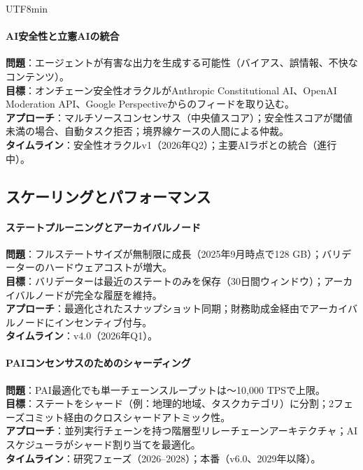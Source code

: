 \documentclass[11pt]{article}
\begin{document}
\begin{CJK}{UTF8}{min}
\begin{itemize}[noitemsep]
\paragraph{AI安全性と立憲AIの統合}
\textbf{問題}：エージェントが有害な出力を生成する可能性（バイアス、誤情報、不快なコンテンツ）。\\
\textbf{目標}：オンチェーン安全性オラクルがAnthropic Constitutional AI、OpenAI Moderation API、Google Perspectiveからのフィードを取り込む。\\
\textbf{アプローチ}：マルチソースコンセンサス（中央値スコア）；安全性スコアが閾値未満の場合、自動タスク拒否；境界線ケースの人間による仲裁。\\
\textbf{タイムライン}：安全性オラクルv1（2026年Q2）；主要AIラボとの統合（進行中）。

\subsection{スケーリングとパフォーマンス}

\paragraph{ステートプルーニングとアーカイバルノード}
\textbf{問題}：フルステートサイズが無制限に成長（2025年9月時点で128 GB）；バリデーターのハードウェアコストが増大。\\
\textbf{目標}：バリデーターは最近のステートのみを保存（30日間ウィンドウ）；アーカイバルノードが完全な履歴を維持。\\
\textbf{アプローチ}：最適化されたスナップショット同期；財務助成金経由でアーカイバルノードにインセンティブ付与。\\
\textbf{タイムライン}：v4.0（2026年Q1）。

\paragraph{PAIコンセンサスのためのシャーディング}
\textbf{問題}：PAI最適化でも単一チェーンスループットは〜10,000 TPSで上限。\\
\textbf{目標}：ステートをシャード（例：地理的地域、タスクカテゴリ）に分割；2フェーズコミット経由のクロスシャードアトミック性。\\
\textbf{アプローチ}：並列実行チェーンを持つ階層型リレーチェーンアーキテクチャ；AIスケジューラがシャード割り当てを最適化。\\
\textbf{タイムライン}：研究フェーズ（2026--2028）；本番（v6.0、2029年以降）。


\end{itemize}
\end{CJK}
\end{document}
